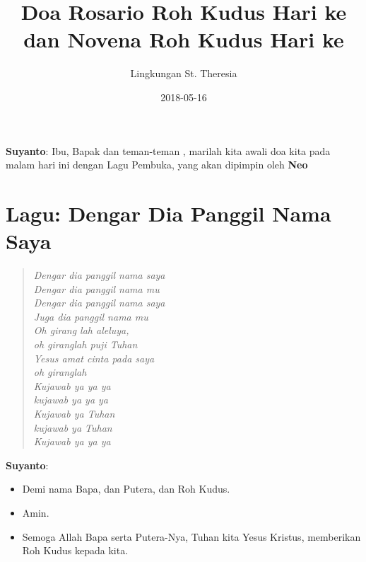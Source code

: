 \documentclass[12pt]{article}
\title{Doa Rosario Roh Kudus Hari ke \rosario{} dan Novena Roh Kudus Hari ke \novena{}}
\author{Lingkungan St. Theresia}
\date{2018-05-16}
\def\petugasA{\textbf{Suyanto}}
\def\petugasB{\textbf{Neo}}
\newcommand{\BU}[1]{\begin{itemize} \item[U:] #1 \end{itemize}}
\newcommand{\BP}[1]{\begin{itemize} \item[P:] #1 \end{itemize}}
\begin{document}
	
 \maketitle
\onehalfspacing
\petugasA: Ibu, Bapak dan teman-teman , marilah kita awali doa kita pada
malam hari ini dengan Lagu Pembuka, yang akan dipimpin oleh \petugasB

\section*{Lagu: Dengar Dia Panggil
Nama Saya }
\begin{quote}
\textit{
Dengar dia panggil nama saya\\
Dengar dia panggil nama mu\\ 
Dengar dia panggil nama saya\\
Juga dia panggil nama mu\\ 
Oh girang lah aleluya,  \\
oh giranglah puji Tuhan\\ 
Yesus amat cinta pada saya\\ 
oh giranglah\\  
Kujawab ya ya ya \\
kujawab ya ya ya \\
Kujawab ya Tuhan \\
kujawab ya Tuhan \\ 
Kujawab ya ya ya
}
\end{quote}

\petugasA: 

\BP{Demi nama Bapa, dan Putera, dan Roh Kudus.}

\BU{Amin.}

\BP{Semoga Allah Bapa serta Putera-Nya, Tuhan kita Yesus Kristus,
memberikan Roh Kudus kepada kita.}
\end{document}
